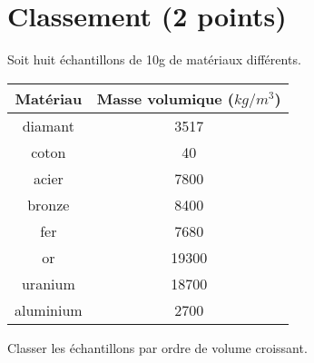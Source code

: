 \section{Classement (2 points)}\label{ex:classement}

Soit huit échantillons de 10g de matériaux différents.

{\small \begin{center}
	\begin{tabular}{|@{\ }c@{\ }|@{\ }c@{\ }|}
		\hline
		\textbf{Matériau}  & \textbf{Masse volumique ($kg/m^3$)} \\ \hline
		diamant   & \num{3517}                 \\ \hline
		coton     & \num{40}                   \\ \hline
		acier     & \num{7800}                 \\ \hline
		bronze    & \num{8400}                 \\ \hline
		fer       & \num{7680}                 \\ \hline
		or        & \num{19300}                \\ \hline
		uranium   & \num{18700}                \\ \hline
		aluminium & \num{2700}                 \\ \hline
	\end{tabular}
\end{center}}

\begin{questions}
	\question[2] Classer les échantillons par ordre de volume croissant.
	
\end{questions}